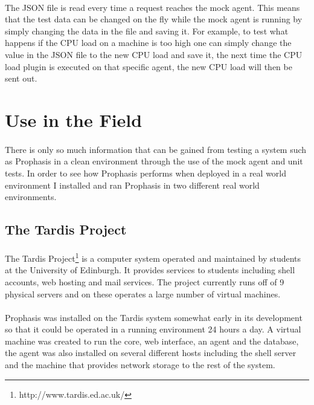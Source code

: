 \documentclass[bsc,logo,twoside,singlespacing,notimes]{infthesis}
\begin{document}
\paragraph*{}
	The JSON file is read every time a request reaches the mock agent.  This means
	that the test data can be changed on the fly while the mock agent is running by
	simply changing the data in the file and saving it.  For example, to test what
	happens if the CPU load on a machine is too high one can simply change the
	value in the JSON file to the new CPU load and save it, the next time the CPU
	load plugin is executed on that specific agent, the new CPU load will then be
	sent out.
	
\section{Use in the Field}
\paragraph*{}
	There is only so much information that can be gained from testing a system such
	as Prophasis in a clean environment through the use of the mock agent and unit
	tests.  In order to see how Prophasis performs when deployed in a real world
	environment I installed and ran Prophasis in two different real world
	environments.
	
\subsection{The Tardis Project}
\paragraph*{}
	The Tardis Project\footnote{http://www.tardis.ed.ac.uk/} is a computer system
	operated and maintained by students at the University of Edinburgh.
	It provides services to students including shell accounts, web hosting and mail
	services.  The project currently runs off of 9 physical servers and on these
	operates a large number of virtual machines.
	
\paragraph*{}
	Prophasis was installed on the Tardis system somewhat early in its development
	so that it could be operated in a running environment 24 hours a day. A virtual
	machine was created to run the core, web interface, an agent and the database,
	the agent was also installed on several different hosts including the shell
	server and the machine that provides network storage to the rest of the system.
	
\end{document}
